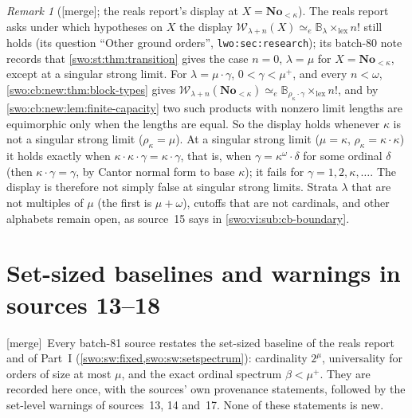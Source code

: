 \documentclass[11pt]{article}
\theoremstyle{definition}
\theoremstyle{remark}
\newtheorem{remark}[remark]{Remark}
\newcommand{\No}{\mathbf{No}}
\newcommand{\WO}{\mathcal W}
\newcommand{\B}{\mathbb B}
\newcommand{\lex}{\mathrm{lex}}
\newcommand{\equi}{\mathrel{\simeq_{\!e}}}
\newcommand{\code}[1]{\texttt{\small #1}}
\newcommand{\merge}{\textsf{[merge]}}
\begin{document}
\begin{remark}[\merge; the reals report's display at $X=\No_{<\kappa}$]\label{swo:vi:rem:lwo-display}
The reals report asks under which hypotheses on $X$ the display
$\WO_{\lambda+n}(X)\equi\B_\lambda\times_\lex n!$ still holds (its question
``Other ground orders'', \code{lwo:sec:research}); its batch-80 note records
that \cref{swo:st:thm:transition} gives the case $n=0$, $\lambda=\mu$ for
$X=\No_{<\kappa}$, except at a singular strong limit. For $\lambda=\mu\cdot\gamma$,
$0<\gamma<\mu^+$, and every $n<\omega$, \cref{swo:cb:new:thm:block-types} gives
$\WO_{\lambda+n}(\No_{<\kappa})\equi\B_{\rho_\kappa\cdot\gamma}\times_\lex n!$, and
by \cref{swo:cb:new:lem:finite-capacity} two such products with nonzero limit
lengths are equimorphic only when the lengths are equal. So the display holds
whenever $\kappa$ is not a singular strong limit ($\rho_\kappa=\mu$). At a
singular strong limit ($\mu=\kappa$, $\rho_\kappa=\kappa\cdot\kappa$) it holds
exactly when $\kappa\cdot\kappa\cdot\gamma=\kappa\cdot\gamma$, that is, when
$\gamma=\kappa^\omega\cdot\delta$ for some ordinal $\delta$ (then
$\kappa\cdot\gamma=\gamma$, by Cantor normal form to base $\kappa$); it fails
for $\gamma=1,2,\kappa,\ldots$. The display is therefore not simply false at
singular strong limits. Strata $\lambda$ that are not multiples of $\mu$
(the first is $\mu+\omega$), cutoffs that are not cardinals, and other alphabets
remain open, as source~15 says in \cref{swo:vi:sub:cb-boundary}.
\end{remark}

\section{Set-sized baselines and warnings in sources 13--18}\label{swo:vi:sec:baselines}

\merge\ Every batch-81 source restates the set-sized baseline of the reals
report and of Part~I (\cref{swo:sw:fixed,swo:sw:setspectrum}): cardinality
$2^\mu$, universality for orders of size at most $\mu$, and the exact ordinal
spectrum $\beta<\mu^+$. They are recorded here once, with the sources' own
provenance statements, followed by the set-level warnings of sources~13, 14
and~17. None of these statements is new.
\end{document}
